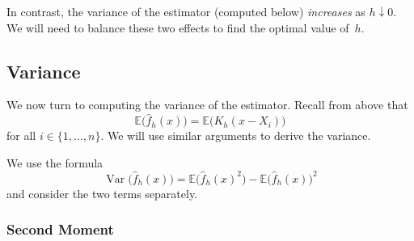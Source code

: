 \documentclass[
  a4paper,
]{article}
\theoremstyle{definition}
\theoremstyle{definition}
\theoremstyle{definition}
\theoremstyle{definition}
\theoremstyle{remark}
\begin{document}
In contrast, the variance of the estimator (computed below) \emph{increases}
as \(h \downarrow 0\). We will need to balance these two effects to find the
optimal value of~\(h\).

\subsection{Variance}\label{X02-error-var}

We now turn to computing the variance of the estimator. Recall from above that
\begin{equation}
  \mathbb{E}\bigl( \hat f_h(x) \bigr)
  = \mathbb{E}\bigl( K_h(x - X_i) \bigr)  \label{eq:E-hat-f-K-h}
\end{equation}
for all \(i \in \{1, \ldots, n\}\). We will use similar arguments to derive
the variance.

We use the formula
\begin{equation*}
  \mathop{\mathrm{Var}}\bigl( \hat f_h(x) \bigr)
  = \mathbb{E}\bigl( \hat f_h(x)^2 \bigr) - \mathbb{E}\bigl( \hat f_h(x) \bigr)^2
\end{equation*}
and consider the two terms separately.

\subsubsection{Second Moment}\label{second-moment}
\end{document}
